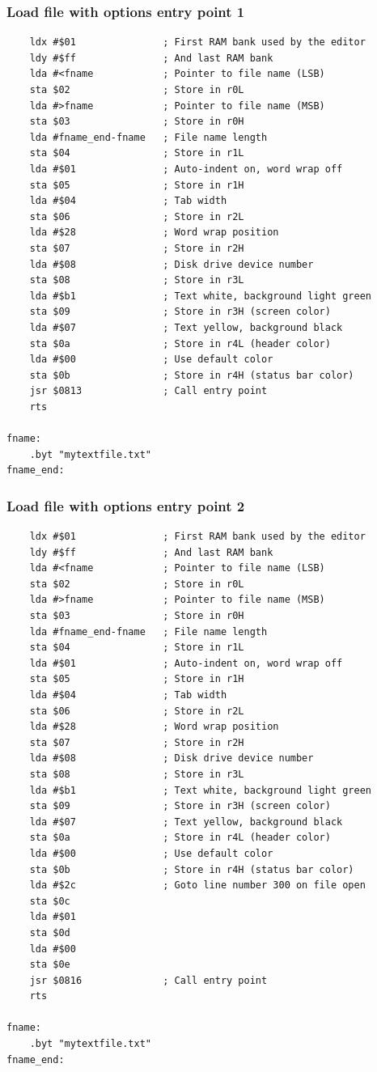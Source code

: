 \documentclass{article}
\begin{document}
\subsubsection{Load file with options entry point 1}
\begin{verbatim}
    ldx #$01               ; First RAM bank used by the editor
    ldy #$ff               ; And last RAM bank
    lda #<fname            ; Pointer to file name (LSB)
    sta $02                ; Store in r0L
    lda #>fname            ; Pointer to file name (MSB)
    sta $03                ; Store in r0H
    lda #fname_end-fname   ; File name length
    sta $04                ; Store in r1L
    lda #$01               ; Auto-indent on, word wrap off
    sta $05                ; Store in r1H
    lda #$04               ; Tab width
    sta $06                ; Store in r2L
    lda #$28               ; Word wrap position
    sta $07                ; Store in r2H
    lda #$08               ; Disk drive device number
    sta $08                ; Store in r3L
    lda #$b1               ; Text white, background light green
    sta $09                ; Store in r3H (screen color)
    lda #$07               ; Text yellow, background black
    sta $0a                ; Store in r4L (header color)
    lda #$00               ; Use default color
    sta $0b                ; Store in r4H (status bar color)
    jsr $0813              ; Call entry point
    rts

fname:
    .byt "mytextfile.txt"
fname_end:
\end{verbatim}

\subsubsection{Load file with options entry point 2}
\begin{verbatim}
    ldx #$01               ; First RAM bank used by the editor
    ldy #$ff               ; And last RAM bank
    lda #<fname            ; Pointer to file name (LSB)
    sta $02                ; Store in r0L
    lda #>fname            ; Pointer to file name (MSB)
    sta $03                ; Store in r0H
    lda #fname_end-fname   ; File name length
    sta $04                ; Store in r1L
    lda #$01               ; Auto-indent on, word wrap off
    sta $05                ; Store in r1H
    lda #$04               ; Tab width
    sta $06                ; Store in r2L
    lda #$28               ; Word wrap position
    sta $07                ; Store in r2H
    lda #$08               ; Disk drive device number
    sta $08                ; Store in r3L
    lda #$b1               ; Text white, background light green
    sta $09                ; Store in r3H (screen color)
    lda #$07               ; Text yellow, background black
    sta $0a                ; Store in r4L (header color)
    lda #$00               ; Use default color
    sta $0b                ; Store in r4H (status bar color)
    lda #$2c               ; Goto line number 300 on file open
    sta $0c
    lda #$01
    sta $0d
    lda #$00
    sta $0e
    jsr $0816              ; Call entry point
    rts

fname:
    .byt "mytextfile.txt"
fname_end:
\end{verbatim}
\end{document}
